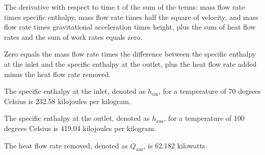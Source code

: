 The derivative with respect to time t of the sum of the terms: mass flow rate times specific enthalpy, mass flow rate times half the square of velocity, and mass flow rate times gravitational acceleration times height, plus the sum of heat flow rates and the sum of work rates equals zero.

Zero equals the mass flow rate times the difference between the specific enthalpy at the inlet and the specific enthalpy at the outlet, plus the heat flow rate added minus the heat flow rate removed.

The specific enthalpy at the inlet, denoted as \( h_{\text{ein}} \), for a temperature of 70 degrees Celsius is 232.58 kilojoules per kilogram.

The specific enthalpy at the outlet, denoted as \( h_{\text{aus}} \), for a temperature of 100 degrees Celsius is 419.04 kilojoules per kilogram.

The heat flow rate removed, denoted as \( \dot{Q}_{\text{aus}} \), is 62.182 kilowatts.
